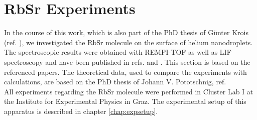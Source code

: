 \documentclass[parskip,12pt,headsepline,a4paper] {scrbook}
\begin{document}
\section{RbSr Experiments}
\label{chap:rbsrresults}
\vspace{-1\baselineskip}
In the course of this work, which is also part of the PhD thesis of G\"unter Krois (ref. \cite{krois-doc}), we investigated the RbSr molecule on the surface of helium nanodroplets. The spectroscopic results were obtained with REMPI-TOF as well as LIF spectroscopy and have been published in refs. \cite{paperlackner} and \cite{paperkrois}. This section is based on the referenced papers. The theoretical data, used to compare the experiments with calculations, are based on the PhD thesis of Johann V. Pototschnig, ref. \cite{johann-doc} \\
All experiments regarding the RbSr molecule were performed in Cluster Lab I at the Institute for Experimental Physics in Graz. The experimental setup of this apparatus is described in chapter \ref{chap:expsetup}.
\end{document}
